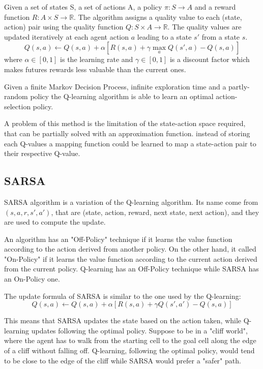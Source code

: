 Given a set of states S, a set of actions A, a policy $\pi : S \rightarrow A$ and a reward function $R : A \times S \rightarrow \mathbb{R}$.
The algorithm assigns a quality value to each (state, action) pair using the quality function $Q : S \times A \rightarrow \mathbb{R}$.
The quality values are updated iteratively at each agent action $a$ leading to a state $s'$ from a state $s$.
\begin{equation}
    Q(s, a) \leftarrow Q(s, a) + \alpha [R(s, a) + \gamma \max_a Q(s', a) - Q(s, a)]
\end{equation}
where $\alpha \in [0, 1]$ is the learning rate and $\gamma \in [0, 1]$ is a discount factor which makes futures rewards less valuable than the current ones.

Given a finite Markov Decision Process, infinite exploration time and a partly-random policy
the Q-learning algorithm is able to learn an optimal action-selection policy.

A problem of this method is the limitation of the state-action space required, that can be partially solved with an approximation function.
instead of storing each Q-values a mapping function could be learned to map a state-action pair to their respective Q-value.

\subsection{SARSA}
SARSA algorithm \cite{qiang2011reinforcement} is a variation of the Q-learning algorithm.
Its name come from $(s, a, r, s', a')$, that are (state, action, reward, next state, next action), and they are used to compute the update.

An algorithm has an "Off-Policy" technique if it learns the value function according to the action derived from another policy. On the other hand, it called "On-Policy" if it learns the value function according to the current action derived from the current policy.
Q-learning has an Off-Policy technique while SARSA has an On-Policy one.

The update formula of SARSA is similar to the one used by the Q-learning:
\begin{equation}
    Q(s, a) \leftarrow Q(s, a) + \alpha [R(s, a) + \gamma Q(s', a') - Q(s, a)]
\end{equation}

This means that SARSA updates the state based on the action taken, while Q-learning updates following the optimal policy.
Suppose to be in a "cliff world", where the agent has to walk from the starting cell to the goal cell along the edge of a cliff without falling off. Q-learning, following the optimal policy, would tend to be close to the edge of the cliff while SARSA would prefer a "safer" path.

